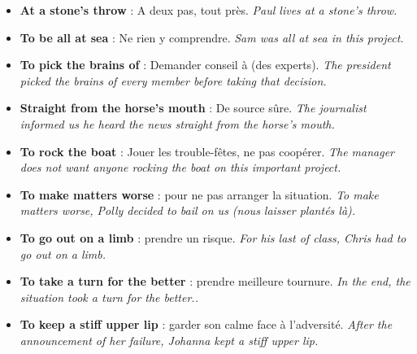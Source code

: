 \documentclass[11pt]{article}
\begin{document}
\begin{itemize}
\item \textbf{At a stone’s throw} : A deux pas, tout près. \emph{Paul lives at a stone’s throw.}
\item \textbf{To be all at sea} : Ne rien y comprendre. \emph{Sam was all at sea in this project.}
\item \textbf{To pick the brains of} : Demander conseil à (des experts). \emph{The president picked the brains of every member before taking that decision.}
\item \textbf{Straight from the horse’s mouth} : De source sûre. \emph{The journalist informed us he heard the news straight from the horse’s mouth.}
\item \textbf{To rock the boat} : Jouer les trouble-fêtes, ne pas coopérer. \emph{The manager does not want anyone rocking the boat on this important project.}
\item \textbf{To make matters worse} : pour ne pas arranger la situation. \emph{To make matters worse, Polly decided to bail on us (nous laisser plantés là).}
\item \textbf{To go out on a limb} : prendre un risque. \emph{For his last of class, Chris had to go out on a limb.}
\item \textbf{To take a turn for the better} : prendre meilleure tournure. \emph{In the end, the situation took a turn for the better..}
\item \textbf{To keep a stiff upper lip} : garder son calme face à l’adversité. \emph{After the announcement of her failure, Johanna kept a stiff upper lip.}
\end{itemize}
\end{document}
